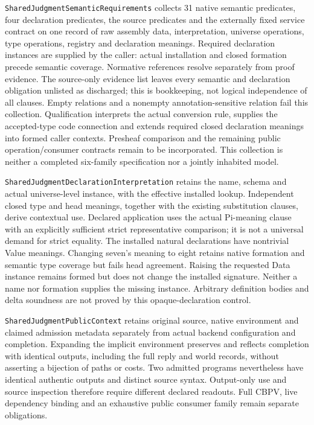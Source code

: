 \documentclass[11pt]{article}
\theoremstyle{definition}
\theoremstyle{remark}
\begin{document}
\nolinkurl{SharedJudgmentSemanticRequirements} collects 31 native semantic
predicates, four declaration predicates, the source predicates and the
externally fixed service contract on one record of raw assembly data,
interpretation, universe operations, type operations, registry and declaration
meanings. Required declaration instances are supplied by the caller: actual
installation and closed formation precede semantic coverage. Normative
references resolve separately from proof evidence. The source-only evidence
list leaves every semantic and declaration obligation unlisted as discharged; this is
bookkeeping, not logical independence of all clauses. Empty relations and a nonempty
annotation-sensitive relation fail this collection. Qualification interprets
the actual conversion rule, supplies the accepted-type code connection and
extends required closed declaration meanings into formed caller contexts.
Presheaf comparison and the remaining public operation/consumer contracts
remain to be incorporated. This collection is neither
a completed six-family specification nor a jointly inhabited model.

\nolinkurl{SharedJudgmentDeclarationInterpretation} retains the name, schema
and actual universe-level instance, with the effective installed lookup.
Independent closed type and head meanings, together with the existing
substitution clauses, derive contextual use. Declared application uses the
actual Pi-meaning clause with an explicitly sufficient strict representative
comparison; it is not a universal demand for strict equality. The installed
natural declarations have nontrivial Value meanings. Changing seven's meaning
to eight retains native formation and semantic type coverage but fails head
agreement. Raising the requested Data instance remains formed but does not
change the installed signature. Neither a name nor formation supplies the
missing instance. Arbitrary definition bodies and delta soundness are not
proved by this opaque-declaration control.

\nolinkurl{SharedJudgmentPublicContext} retains original source, native
environment and claimed admission metadata separately from actual backend
configuration and completion. Expanding the implicit environment preserves
and reflects completion with identical outputs, including the full reply
and world records, without asserting a bijection of paths or costs. Two
admitted programs nevertheless have identical authentic outputs and
distinct source syntax. Output-only use and source inspection therefore
require different declared readouts. Full CBPV, live dependency binding and
an exhaustive public consumer family remain separate obligations.
\end{document}
